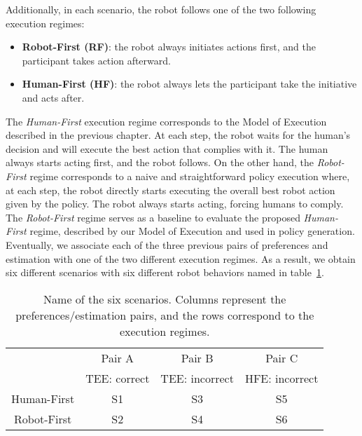 Additionally, in each scenario, the robot follows one of the two following execution regimes:
\begin{itemize}
    \item \textbf{Robot-First (RF)}: the robot always initiates actions first, and the participant takes action afterward.
    \item \textbf{Human-First (HF)}: the robot always lets the participant take the initiative and acts after.
\end{itemize}
The \textit{Human-First} execution regime corresponds to the Model of Execution described in the previous chapter. At each step, the robot waits for the human's decision and will execute the best action that complies with it. The human always starts acting first, and the robot follows. On the other hand, the \textit{Robot-First} regime corresponds to a naive and straightforward policy execution where, at each step, the robot directly starts executing the overall best robot action given by the policy. The robot always starts acting, forcing humans to comply. The \textit{Robot-First} regime serves as a baseline to evaluate the proposed \textit{Human-First} regime, described by our Model of Execution and used in policy generation.
Eventually, we associate each of the three previous pairs of preferences and estimation with one of the two different execution regimes. As a result, we obtain six different scenarios with six different robot behaviors named in table~\ref{tab:scenario_names}.

\begin{table}
    \caption{Name of the six scenarios. 
    Columns represent the preferences/estimation pairs, and the rows correspond to the execution regimes.}
    \begin{center}
    \begin{tabular}{c|c|c|c|}
        \cline{2-4}
                                                & Pair A        & Pair B            & Pair C\\
                                                & TEE: correct  & TEE: incorrect    & HFE: incorrect\\
        \hline
        \multicolumn{1}{|c|}{Human-First}       & S1            & S3                & S5\\
        \hline
        \multicolumn{1}{|c|}{Robot-First}       & S2            & S4                & S6\\
        \hline
    \end{tabular}
    \end{center}
    \label{tab:scenario_names}
\end{table}

